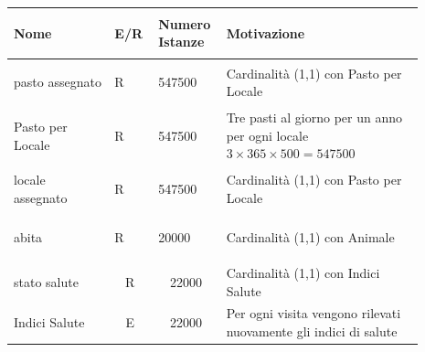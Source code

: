 \documentclass[12pt,a4paper]{article}
\begin{document}
\begin{center}\setlength{\extrarowheight}{1.5pt}\begin{longtable}{|p{0.23\linewidth}|p{0.1\linewidth}|p{0.11\linewidth}|p{0.45\linewidth}|}
\hline \textbf{Nome}   & \begin{center}\vspace{-15pt}\textbf{E/R}\end{center} & \textbf{Numero Istanze} & \textbf{Motivazione}\\ 
\hline
pasto assegnato 				& \begin{center}
\vspace{-25pt}R
\end{center}
					& \begin{center}
					\vspace{-25pt}547500\end{center}
					&  Cardinalità (1,1) con Pasto per Locale \\ 

\hline
Pasto per Locale 				& \begin{center}
\vspace{-25pt}R
\end{center}
					& \begin{center}
					\vspace{-25pt}547500\end{center}
					&  Tre pasti al giorno per un anno per ogni locale $3\times365\times500=547500$ \\ 

\hline
locale assegnato 				& \begin{center}
\vspace{-25pt}R
\end{center}
					& \begin{center}
					\vspace{-25pt}547500\end{center}
					&  Cardinalità (1,1) con Pasto per Locale \\ 

\hline
abita 				& \begin{center}
\vspace{-25pt}R
\end{center}
					& \begin{center}
					\vspace{-25pt}20000\end{center}
					&  Cardinalità (1,1) con Animale \\ 

\hline
stato salute
 & 
\multicolumn{1}{|c|}{R}
 & 
\multicolumn{1}{|c|}{22000}
 & 
Cardinalità (1,1) con Indici Salute
\\
\hline
Indici Salute
 & 
\multicolumn{1}{|c|}{E}
 & 
\multicolumn{1}{|c|}{22000}
 & 
Per ogni visita vengono rilevati nuovamente gli indici di salute
\\
\hline
\end{longtable}\end{center}
\end{document}
